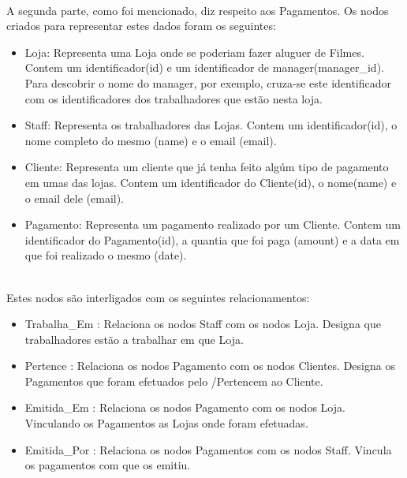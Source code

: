 \hfill\\
A segunda parte, como foi mencionado, diz respeito aos Pagamentos. Os nodos criados para representar estes dados foram os seguintes:\newline
\hfill\\
\begin{itemize}

\item Loja: Representa uma Loja onde se poderiam fazer aluguer de Filmes. Contem um identificador(id) e um identificador de manager(manager\_id). Para descobrir o nome do manager, por exemplo, cruza-se este identificador com os identificadores dos trabalhadores que estão nesta loja.
\hfill\\
\item Staff: Representa os trabalhadores das Lojas. Contem um identificador(id), o nome completo do mesmo (name) e o email (email).
\hfill\\
\item Cliente: Representa um cliente que já tenha feito algúm tipo de pagamento em umas das lojas. Contem um identificador do Cliente(id), o nome(name) e o email dele (email).
\hfill\\
\item Pagamento: Representa um pagamento realizado por um Cliente. Contem um identificador do Pagamento(id), a quantia que foi paga (amount) e a data em que foi realizado o mesmo (date).

\end{itemize}
\hfill\\
Estes nodos são interligados com os seguintes relacionamentos:\newline
\hfill\\
\begin{itemize}

\item Trabalha\_Em : Relaciona os nodos Staff com os nodos Loja. Designa que trabalhadores estão a trabalhar em que Loja.
\hfill\\
\item Pertence : Relaciona os nodos Pagamento com os nodos Clientes. Designa os Pagamentos que foram efetuados pelo /Pertencem ao Cliente.
\hfill\\
\item Emitida\_Em : Relaciona os nodos Pagamento com os nodos Loja. Vinculando os Pagamentos as Lojas onde foram efetuadas.
\hfill\\
\item Emitida\_Por : Relaciona os nodos Pagamentos com os nodos Staff. Vincula os pagamentos com que os emitiu.

\end{itemize}
